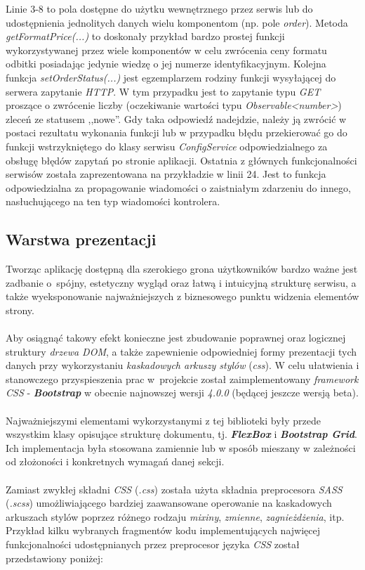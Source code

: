 \noindent Linie 3-8 to pola dostępne do użytku wewnętrznego przez serwis lub do udostępnienia jednolitych danych wielu komponentom (np. pole \textit{order}). Metoda \textit{getFormatPrice(...)} to doskonały przykład bardzo prostej funkcji wykorzystywanej przez wiele komponentów w celu zwrócenia ceny formatu odbitki posiadając jedynie wiedzę o jej numerze identyfikacyjnym. Kolejna funkcja \textit{setOrderStatus(...)} jest egzemplarzem rodziny funkcji wysyłającej do serwera zapytanie \textit{HTTP}. W tym przypadku jest to zapytanie typu \textit{GET} proszące o zwrócenie liczby (oczekiwanie wartości typu \textit{Observable<number>}) zleceń ze statusem ,,nowe''. Gdy taka odpowiedź nadejdzie, należy ją zwrócić w postaci rezultatu wykonania funkcji lub w przypadku błędu przekierować go do funkcji wstrzykniętego do klasy serwisu \textit{ConfigService} odpowiedzialnego za obsługę błędów zapytań po stronie aplikacji. Ostatnia z głównych funkcjonalności serwisów została zaprezentowana na przykładzie w linii 24. Jest to funkcja odpowiedzialna za propagowanie wiadomości o zaistniałym zdarzeniu do innego, nasłuchującego na ten typ wiadomości kontrolera.
\newpage
\subsection{Warstwa prezentacji}
\quad Tworząc aplikację dostępną dla szerokiego grona użytkowników bardzo ważne jest zadbanie o~spójny, estetyczny wygląd oraz łatwą i intuicyjną strukturę serwisu, a także wyeksponowanie najważniejszych z biznesowego punktu widzenia elementów strony.\\
\\
Aby osiągnąć takowy efekt konieczne jest zbudowanie poprawnej oraz logicznej struktury \textit{drzewa DOM}, a także zapewnienie odpowiedniej formy prezentacji tych danych przy wykorzystaniu \textit{kaskadowych arkuszy stylów} (\textit{css}). W celu ułatwienia i stanowczego przyspieszenia prac w~projekcie został zaimplementowany \textit{framework CSS} - \textit{\textbf{Bootstrap}} w obecnie najnowszej wersji \textit{4.0.0} (będącej jeszcze wersją beta).\\
\\
Najważniejszymi elementami wykorzystanymi z tej biblioteki były przede wszystkim klasy opisujące strukturę dokumentu, tj. \textbf{\textit{FlexBox}} i \textbf{\textit{Bootstrap Grid}}. Ich implementacja była stosowana zamiennie lub w sposób mieszany w zależności od złożoności i konkretnych wymagań danej sekcji.\\
\\
Zamiast zwykłej składni \textit{CSS} (\textit{.css}) została użyta składnia preprocesora \textit{SASS} (\textit{.scss}) umożliwiającego bardziej zaawansowane operowanie na kaskadowych arkuszach stylów poprzez różnego rodzaju \textit{mixiny}, \textit{zmienne}, \textit{zagnieżdżenia}, itp. Przykład kilku wybranych fragmentów kodu implementujących najwięcej funkcjonalności udostępnianych przez preprocesor języka \textit{CSS} został przedstawiony poniżej:

